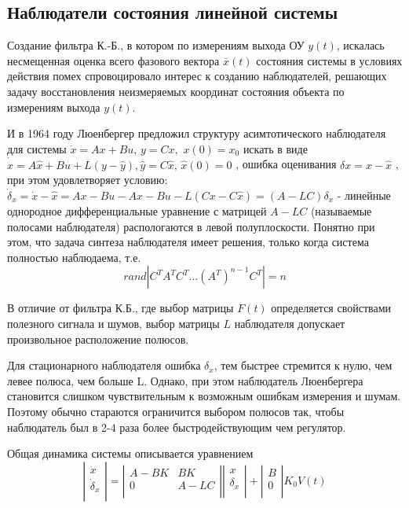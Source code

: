 \documentclass[preprint,russian,a5paper,10pt,twoside,mediummath]{ncc}
\begin{document}
	\subsection{Наблюдатели состояния линейной системы\label{stochastic:observers}}
\par Создание фильтра К.-Б., в котором по измерениям выхода ОУ $y(t)$, искалась несмещенная оценка всего фазового вектора $\bar{x}(t)$ состояния системы в условиях действия помех спровоцировало интерес к созданию наблюдателей, решающих задачу восстановления неизмеряемых координат состояния объекта по измерениям выхода $y(t)$.
\par И в 1964 году Люенбергер предложил структуру асимтотического наблюдателя для системы $\dot{x}=Ax+Bu,\,y=Cx,\,\,x(0)={{x}_{0}}$  искать в виде $\dot{\hat{x}}=A\hat{x}+Bu+L(y-\hat{y}),\hat{y}=C\hat{x},\,\hat{x}(0)=0$ , ошибка оценивания $\delta x=x-\hat{x}$ ,
при этом удовлетворяет условию: ${{\dot{\delta }}_{x}}=\dot{x}-\hat{x}=Ax-Bu-A\hat{x}-Bu-L(Cx-C\hat{x})=(A-LC){{\delta }_{x}}$ - линейные однородное дифференциальные уравнение с матрицей $A-LC$ 
(называемые полосами наблюдателя) распологаются в левой полуплоскости. Понятно при этом, что задача синтеза наблюдателя имеет решения, только когда система полностью наблюдаема, т.е. 
\[rand|{{C}^{T}}{{A}^{T}}{{C}^{T}}...{{({{A}^{T}})}^{n-1}}{{C}^{T}}|=n\] 
\par В отличие от фильтра К.Б., где выбор матрицы $F(t)$ 
определяется свойствами полезного сигнала и шумов, выбор матрицы $L$ 
наблюдателя допускает произвольное расположение полюсов. 
\par Для стационарного наблюдателя ошибка ${{\delta }_{x}}$, тем быстрее стремится к нулю, чем левее полюса, чем больше L. Однако, при этом наблюдатель Люенбергера становится слишком чувствительным к возможным ошибкам измерения и шумам. Поэтому обычно стараются ограничится  выбором полюсов так, чтобы наблюдатель был в 2-4 раза более быстродействующим чем регулятор. 
\par Общая динамика системы описывается уравнением \[\left| \begin{matrix}
   {\dot{x}}  \\
   {{{\dot{\delta }}}_{x}}  \\
\end{matrix} \right|=\left| \begin{matrix}
   A-BK & BK  \\
   0 & A-LC  \\
\end{matrix} \right|\left| \begin{matrix}
   x  \\
   {{\delta }_{x}}  \\
\end{matrix} \right|+\left| \begin{matrix}
   B  \\
   0  \\
\end{matrix} \right|{{K}_{0}}V(t)\]
\end{document}
